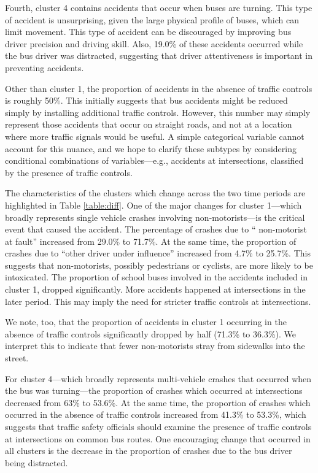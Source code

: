 Fourth, cluster 4 contains accidents that occur when buses are
turning. This type of accident is unsurprising, given the large
physical profile of buses, which can limit movement. This type of
accident can be discouraged by improving bus driver precision and
driving skill. Also, 19.0\% of these accidents occurred while the bus
driver was distracted, suggesting that driver attentiveness is
important in preventing accidents.


Other than cluster 1, the proportion of accidents in the absence of
traffic controls is roughly 50\%. This initially suggests that bus
accidents might be reduced simply by installing additional traffic
controls. However, this number may simply represent those accidents
that occur on straight roads, and not at a location where more traffic
signals would be useful. A simple categorical variable cannot account
for this nuance, and we hope to clarify these subtypes by
considering conditional combinations of variables---e.g., accidents at
intersections, classified by the presence of traffic controls.

The characteristics of the clusters which change across the two time
periods are highlighted in Table \ref{table:diff}. One of the major
changes for cluster 1---which broadly represents single vehicle
crashes involving non-motorists---is the critical event that caused
the accident. The percentage of crashes due to ``
non-motorist at fault'' increased from 29.0\% to 71.7\%. At the same
time, the proportion of crashes
due to ``other driver under influence'' increased from 4.7\% to
25.7\%. This suggests that non-motorists, possibly pedestrians or cyclists, are
more likely to be intoxicated. The proportion of school buses involved in the accidents included in cluster 1, dropped significantly. More accidents happened at intersections in the later period. This may imply the need for stricter traffic controls at intersections.

We note, too, that the proportion of accidents in cluster 1 occurring in
the absence of traffic controls significantly dropped by half (71.3\% to 36.3\%). We interpret this to indicate that
fewer non-motorists  stray from sidewalks into the street.

For cluster 4---which broadly represents multi-vehicle crashes that
occurred when the bus was turning---the proportion of crashes which
occurred at intersections decreased from 63\% to 53.6\%. At the same
time, the proportion of crashes which occurred in the absence of
traffic controls increased from 41.3\% to 53.3\%, which suggests that
traffic safety officials should examine the presence of traffic
controls at intersections on common bus routes. One encouraging change
that occurred in all clusters is the decrease in the proportion of crashes
due to the bus driver being distracted.

